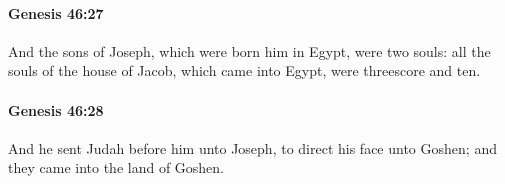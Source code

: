 		\paragraph{Genesis 46:27} %
			\label{GENESIS-46-27}

			And the sons of Joseph, which were born him in Egypt, were two souls: all the souls of the house of Jacob, which came into Egypt, were threescore and ten.


		\paragraph{Genesis 46:28} %
			\label{GENESIS-46-28}

			And he sent Judah before him unto Joseph, to direct his face unto Goshen; and they came into the land of Goshen.


